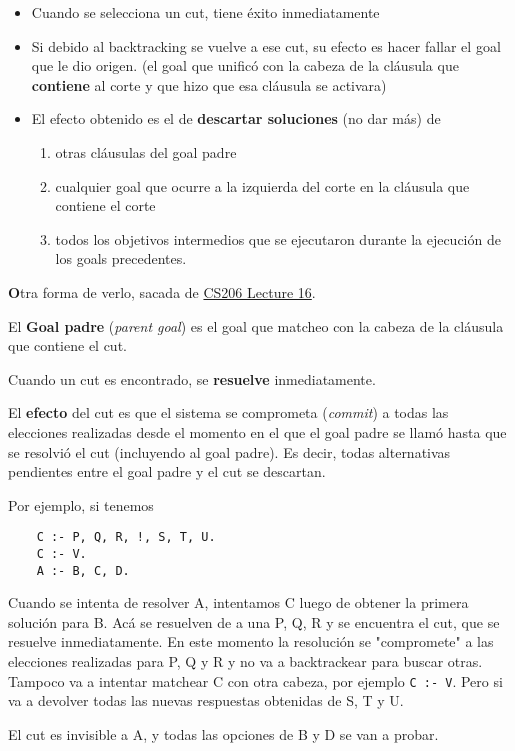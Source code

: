\documentclass{report}
\theoremstyle{definition} %
\newenvironment{nota}[1]
    {\begin{leftbar}\textbf{#1}}
    {\end{leftbar}}
\begin{document}
\begin{itemize}
    \item Cuando se selecciona un cut, tiene éxito inmediatamente
    \item Si debido al backtracking se vuelve a ese cut, su efecto es hacer
    fallar el goal que le dio origen. (el goal que unificó con la cabeza de la
    cláusula que \textbf{contiene} al corte y que hizo que esa cláusula se
    activara)
    \item El efecto obtenido es el de \textbf{descartar soluciones} (no dar más)
    de
    \begin{enumerate}
        \item otras cláusulas del goal padre
        \item cualquier goal que ocurre a la izquierda del corte en la cláusula
        que contiene el corte
        \item todos los objetivos intermedios que se ejecutaron durante la
        ejecución de los goals precedentes.
    \end{enumerate}
\end{itemize}

\begin{nota}
    Otra forma de verlo, sacada de
    \href{https://www.cse.iitb.ac.in/~cs206/lecs/lec17.pdf}{CS206 Lecture 16}.

    El \textbf{Goal padre} (\textit{parent goal}) es el goal que matcheo con la
    cabeza de la cláusula que contiene el cut.

    Cuando un cut es encontrado, se \textbf{resuelve} inmediatamente.

    El \textbf{efecto} del cut es que el sistema se comprometa (\textit{commit})
    a todas las elecciones realizadas desde el momento en el que el goal padre
    se llamó hasta que se resolvió el cut (incluyendo al goal padre). Es decir,
    todas alternativas pendientes entre el goal padre y el cut se descartan.

    Por ejemplo, si tenemos

    \begin{verbatim}
    C :- P, Q, R, !, S, T, U.
    C :- V.
    A :- B, C, D.
    \end{verbatim}

    Cuando se intenta de resolver A, intentamos C luego de obtener la primera
    solución para B. Acá se resuelven de a una P, Q, R y se encuentra el cut,
    que se resuelve inmediatamente. En este momento la resolución se
    "compromete" a las elecciones realizadas para P, Q y R y no va a
    backtrackear para buscar otras. Tampoco va a intentar matchear C con otra
    cabeza, por ejemplo \texttt{C :- V}. Pero si va a devolver todas las nuevas
    respuestas obtenidas de S, T y U.

    El cut es invisible a A, y todas las opciones de B y D se van a probar.
\end{nota}
\end{document}
